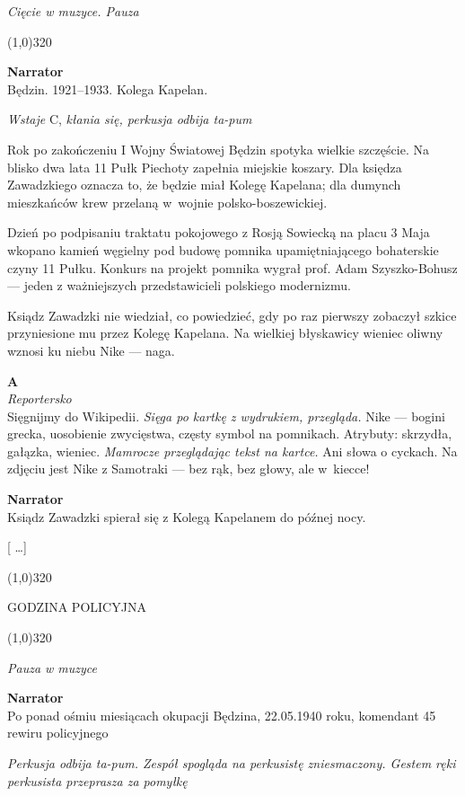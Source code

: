 \documentclass[11pt,a4paper,oneside]{article}
\begin{document}
{\color{light-gray} \emph{Cięcie w muzyce. Pauza}}


\line(1,0){320}


\textbf{Narrator}\\
Będzin. 1921--1933. Kolega Kapelan. 

{\color{light-gray} \emph{Wstaje} C, \emph{kłania się, perkusja odbija
ta-pum}}

Rok po zakończeniu I Wojny Światowej Będzin spotyka wielkie szczęście.
Na blisko dwa lata 11 Pułk Piechoty zapełnia miejskie koszary. Dla
księdza Zawadzkiego oznacza to, że będzie miał Kolegę Kapelana; dla
dumynch mieszkańców krew przelaną w~wojnie polsko-boszewickiej. 

Dzień po podpisaniu traktatu pokojowego z Rosją Sowiecką na placu
3 Maja wkopano kamień węgielny pod budowę pomnika upamiętniającego
bohaterskie czyny 11 Pułku. Konkurs na projekt pomnika wygrał prof.
Adam Szyszko-Bohusz --- jeden z ważniejszych przedstawicieli polskiego
modernizmu.

Ksiądz Zawadzki nie wiedział, co powiedzieć, gdy po raz pierwszy
zobaczył szkice przyniesione mu przez Kolegę Kapelana. Na
wielkiej błyskawicy wieniec oliwny wznosi ku niebu Nike --- naga. 

\textbf{A}\\
{\color{light-gray} \emph{Reportersko}}\\
Sięgnijmy do Wikipedii. {\color{light-gray} \emph{Sięga po kartkę
z wydrukiem, przegląda.}} Nike --- bogini grecka, uosobienie
zwycięstwa, częsty symbol na pomnikach. Atrybuty: skrzydła, gałązka,
wieniec. {\color{light-gray} \emph{Mamrocze przeglądając tekst na
kartce.}} Ani słowa o cyckach. Na zdjęciu jest Nike z Samotraki ---
bez rąk, bez głowy, ale w~kiecce!

\textbf{Narrator}\\
Ksiądz Zawadzki spierał się z Kolegą Kapelanem do późnej nocy. 

{\color{red} [ \dots{}]}

\line(1,0){320}

{\color{red}
GODZINA POLICYJNA
}

\line(1,0){320}

{\color{light-gray} \emph{Pauza w muzyce}}

\textbf{Narrator}\\
Po ponad ośmiu miesiącach okupacji Będzina, 22.05.1940 roku, komendant 45
rewiru policyjnego

{\color{light-gray} \emph{Perkusja odbija ta-pum. Zespół spogląda na
perkusistę zniesmaczony. Gestem ręki perkusista przeprasza za
pomyłkę}}
\end{document}
